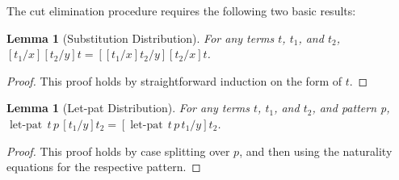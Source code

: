 \documentclass{elsarticle}
\newcommand{\FILLnt}[1]{\mathit{#1}}
\newcommand{\FILLmv}[1]{\mathit{#1}}
\newcommand{\FILLsym}[1]{#1}
\newtheorem{lemma}[theorem]{Lemma}
\begin{document}
\begin{report}
  The cut elimination procedure requires the following two basic
results:
\begin{lemma}[Substitution Distribution]
  \label{lemma:substitution_distribution}
  For any terms $\FILLnt{t}$, $\FILLnt{t_{{\mathrm{1}}}}$, and $\FILLnt{t_{{\mathrm{2}}}}$, $\FILLsym{[}  \FILLnt{t_{{\mathrm{1}}}}  \FILLsym{/}  \FILLmv{x}  \FILLsym{]}  \FILLsym{[}  \FILLnt{t_{{\mathrm{2}}}}  \FILLsym{/}  \FILLmv{y}  \FILLsym{]}  \FILLnt{t} = \FILLsym{[}  \FILLsym{[}  \FILLnt{t_{{\mathrm{1}}}}  \FILLsym{/}  \FILLmv{x}  \FILLsym{]}  \FILLnt{t_{{\mathrm{2}}}}  \FILLsym{/}  \FILLmv{y}  \FILLsym{]}  \FILLsym{[}  \FILLnt{t_{{\mathrm{2}}}}  \FILLsym{/}  \FILLmv{x}  \FILLsym{]}  \FILLnt{t}$.
\end{lemma}
\begin{proof}
  This proof holds by straightforward induction on the form of $t$.
\end{proof}

\begin{lemma}[Let-pat Distribution]
  \label{lemma:let-pat_distribution}
  For any terms $\FILLnt{t}$, $\FILLnt{t_{{\mathrm{1}}}}$, and $\FILLnt{t_{{\mathrm{2}}}}$, and pattern p, \\
  $ \mathsf{\operatorname{let-pat} }\, \FILLnt{t} \, \FILLnt{p} \, \FILLsym{[}  \FILLnt{t_{{\mathrm{1}}}}  \FILLsym{/}  \FILLmv{y}  \FILLsym{]}  \FILLnt{t_{{\mathrm{2}}}}  = \FILLsym{[}   \mathsf{\operatorname{let-pat} }\, \FILLnt{t} \, \FILLnt{p} \, \FILLnt{t_{{\mathrm{1}}}}   \FILLsym{/}  \FILLmv{y}  \FILLsym{]}  \FILLnt{t_{{\mathrm{2}}}}$.
\end{lemma}
\begin{proof}
  This proof holds by case splitting over $p$, and then using the
  naturality equations for the respective pattern.
\end{proof}
\end{report}
\end{document}
